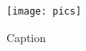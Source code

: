 \begin{figure}
    \centering
    \texttt{[image: pics]}
    \caption{Caption}
    \label{fig:enter-label}
\end{figure}
